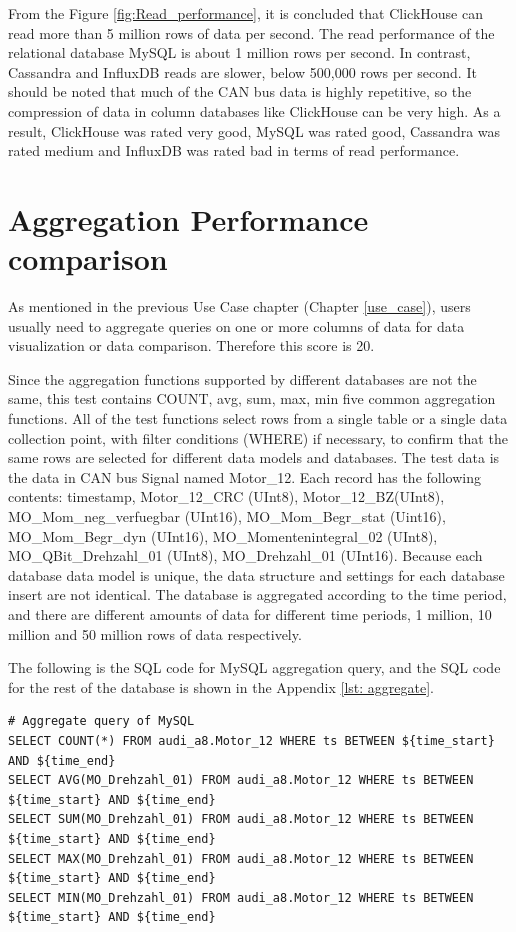 From the Figure \ref{fig:Read_performance}, it is concluded that ClickHouse can read more than 5 million rows of data per second. The read performance of the relational database MySQL is about 1 million rows per second. In contrast, Cassandra and InfluxDB reads are slower, below 500,000 rows per second. It should be noted that much of the CAN bus data is highly repetitive, so the compression of data in column databases like ClickHouse can be very high.  As a result, ClickHouse was rated very good, MySQL was rated good, Cassandra was rated medium and InfluxDB was rated bad in terms of read performance.

\section{Aggregation Performance comparison}
As mentioned in the previous Use Case chapter (Chapter \ref{use_case}), users usually need to aggregate queries on one or more columns of data for data visualization or data comparison. Therefore this score is 20.

Since the aggregation functions supported by different databases are not the same, this test contains COUNT, \ac{avg}, \ac{sum}, \ac{max}, \ac{min} five common aggregation functions. All of the test functions select rows from a single table or a single data collection point, with filter conditions (WHERE) if necessary, to confirm that the same rows are selected for different data models and databases.  The test data is the data in CAN bus Signal named Motor\_12. Each record has the following contents: timestamp, Motor\_12\_CRC (UInt8), Motor\_12\_BZ(UInt8), MO\_Mom\_neg\_verfuegbar (UInt16), MO\_Mom\_Begr\_stat (Uint16), MO\_Mom\_Begr\_dyn (UInt16), MO\_Momentenintegral\_02 (UInt8), MO\_QBit\_Drehzahl\_01 (UInt8), MO\_Drehzahl\_01 (UInt16). Because each database data model is unique, the data structure and settings for each database insert are not identical. The database is aggregated according to the time period, and there are different amounts of data for different time periods, 1 million, 10 million and 50 million rows of data respectively.

The following is the SQL code for MySQL aggregation query, and the SQL code for the rest of the database is shown in the Appendix \ref{lst: aggregate}.
\begin{verbatim}
# Aggregate query of MySQL 
SELECT COUNT(*) FROM audi_a8.Motor_12 WHERE ts BETWEEN ${time_start} AND ${time_end}
SELECT AVG(MO_Drehzahl_01) FROM audi_a8.Motor_12 WHERE ts BETWEEN ${time_start} AND ${time_end}
SELECT SUM(MO_Drehzahl_01) FROM audi_a8.Motor_12 WHERE ts BETWEEN ${time_start} AND ${time_end}
SELECT MAX(MO_Drehzahl_01) FROM audi_a8.Motor_12 WHERE ts BETWEEN ${time_start} AND ${time_end}
SELECT MIN(MO_Drehzahl_01) FROM audi_a8.Motor_12 WHERE ts BETWEEN ${time_start} AND ${time_end}
\end{verbatim}



